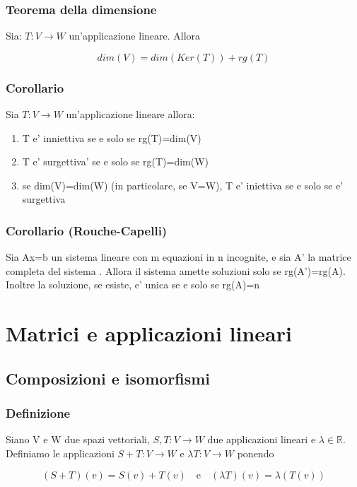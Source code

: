 \documentclass{article}
\begin{document}
\subsubsection{Teorema della dimensione}
\begin{flushleft}
	Sia: $T:V \to W$ un'applicazione lineare. Allora
\end{flushleft}
\begin{equation*}
	dim(V)=dim(Ker(T))+rg(T)
\end{equation*}
\subsubsection{Corollario}
Sia $T: V\to W$ un'applicazione lineare allora:
\begin{enumerate}
	\item T e' inniettiva se e solo se rg(T)=dim(V)
	\item T e' surgettiva' se e solo se rg(T)=dim(W)
	\item se dim(V)=dim(W) (in particolare, se V=W), T e' iniettiva se e solo se e' surgettiva
\end{enumerate}
\subsubsection{Corollario (Rouche-Capelli)}
\begin{flushleft}
	Sia Ax=b un sistema lineare con m equazioni in n incognite, e sia A' la matrice completa del sistema
	. Allora il sistema amette soluzioni solo se rg(A')=rg(A). Inoltre la soluzione, se esiste, e' unica se e solo se rg(A)=n
\end{flushleft}
\section{Matrici e applicazioni lineari}
\subsection{Composizioni e isomorfismi}
\subsubsection{Definizione}
\begin{flushleft}
	Siano V e W due spazi vettoriali, $S,T: V \to W$ due applicazioni lineari e $\lambda \in \mathbb{R}$.
	Definiamo le applicazioni $S+T:V\to W$ e $\lambda T: V\to W$ ponendo
\end{flushleft}
\begin{equation*}
	(S+T)(v)=S(v)+T(v) \quad \text{e} \quad (\lambda T)(v)=\lambda (T(v))
\end{equation*}
\end{document}
